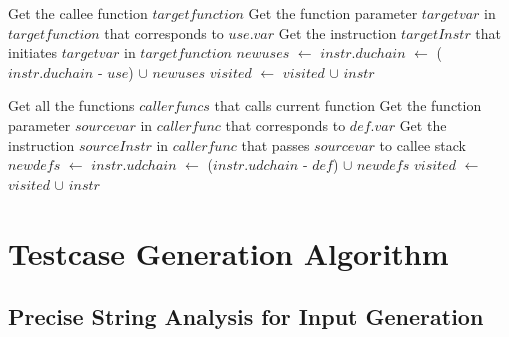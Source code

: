 \begin{algorithm}
\begin{algorithmic}[1]
    \State{}
  \EndIf
      \State Get the callee function $targetfunction$
      \State Get the function parameter $targetvar$ in $targetfunction$ that corresponds to $use.var$
      \State Get the instruction $targetInstr$ that initiates $targetvar$ in $targetfunction$
      \State $newuses$ $\gets$ 
      \State $instr.duchain$ $\gets$ ($instr.duchain$ - $use$) $\cup$ $newuses$
    \EndIf
  \EndFor
  \State $visited$ $\gets$ $visited$ $\cup$ $instr$
  \State{}
\EndFunction
{}
\end{algorithmic}
\end{algorithm}

\begin{algorithm}
\begin{algorithmic}[1]
    \State{}
  \EndIf
      \State Get all the functions $callerfuncs$ that calls current function
        \State Get the function parameter $sourcevar$ in $callerfunc$ that corresponds to $def.var$
        \State Get the instruction $sourceInstr$ in $callerfunc$ that passes $sourcevar$ to callee stack
        \State $newdefs$ $\gets$ 
        \State $instr.udchain$ $\gets$ ($instr.udchain$ - $def$) $\cup$ $newdefs$
      \EndFor
    \EndIf
  \EndFor
  \State $visited$ $\gets$ $visited$ $\cup$ $instr$
  \State{}
\EndFunction
\end{algorithmic}
\end{algorithm}

\section{Testcase Generation Algorithm}

\subsection{Precise String Analysis for Input Generation}


